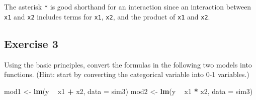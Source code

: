 \documentclass[]{book}
\newenvironment{Shaded}{\begin{snugshade}}{\end{snugshade}}
\newcommand{\ControlFlowTok}[1]{\textcolor[rgb]{0.13,0.29,0.53}{\textbf{#1}}}
\newcommand{\DataTypeTok}[1]{\textcolor[rgb]{0.13,0.29,0.53}{#1}}
\newcommand{\KeywordTok}[1]{\textcolor[rgb]{0.13,0.29,0.53}{\textbf{#1}}}
\newcommand{\NormalTok}[1]{#1}
\newcommand{\OperatorTok}[1]{\textcolor[rgb]{0.81,0.36,0.00}{\textbf{#1}}}
\newcommand{\StringTok}[1]{\textcolor[rgb]{0.31,0.60,0.02}{#1}}
\theoremstyle{plain}
\theoremstyle{remark}
\theoremstyle{definition}
\theoremstyle{definition}
\theoremstyle{definition}
\theoremstyle{remark}
\begin{document}
The asterisk \texttt{*} is good shorthand for an interaction since an
interaction between \texttt{x1} and \texttt{x2} includes terms for
\texttt{x1}, \texttt{x2}, and the product of \texttt{x1} and
\texttt{x2}.

\hypertarget{exercise-3-50}{%
\subsection{Exercise 3}\label{exercise-3-50}}

Using the basic principles, convert the formulas in the following two
models into functions. (Hint: start by converting the categorical
variable into 0-1 variables.)

\begin{Shaded}
\begin{Highlighting}[]
\NormalTok{mod1 <-}\StringTok{ }\KeywordTok{lm}\NormalTok{(y }\OperatorTok{~}\StringTok{ }\NormalTok{x1 }\OperatorTok{+}\StringTok{ }\NormalTok{x2, }\DataTypeTok{data =}\NormalTok{ sim3)}
\NormalTok{mod2 <-}\StringTok{ }\KeywordTok{lm}\NormalTok{(y }\OperatorTok{~}\StringTok{ }\NormalTok{x1 }\OperatorTok{*}\StringTok{ }\NormalTok{x2, }\DataTypeTok{data =}\NormalTok{ sim3)}
\end{Highlighting}
\end{Shaded}

\begin{Shaded}
\end{Shaded}
\end{document}
